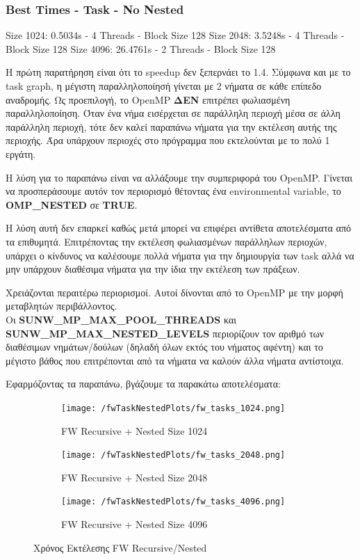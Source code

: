 \documentclass[letterpaper,12pt]{article}
\begin{document}
\subsubsection*{Best Times - Task - No Nested}
Size 1024: 0.5034s - 4 Threads - Block Size 128
\newline
Size 2048: 3.5248s - 4 Threads - Block Size 128
\newline
Size 4096: 26.4761s - 2 Threads - Block Size 128
\newline

Η πρώτη παρατήρηση είναι ότι το speedup δεν ξεπερνάει το 1.4. Σύμφωνα και με το task graph, η μέγιστη
παραλληλοποίησή γίνεται με 2 νήματα σε κάθε επίπεδο αναδρομής. Ως προεπιλογή, το OpenMP \textbf{ΔΕΝ}
επιτρέπει φωλιασμένη παραλληλοποίηση. Όταν ένα νήμα εισέρχεται σε παράλληλη περιοχή μέσα σε άλλη παράλληλη περιοχή,
τότε δεν καλεί παραπάνω νήματα για την εκτέλεση αυτής της περιοχής. Άρα υπάρχουν περιοχές στο πρόγραμμα που εκτελούνται
με το πολύ 1 εργάτη.

Η λύση για το παραπάνω είναι να αλλάξουμε την συμπεριφορά του OpenMP. Γίνεται να προσπεράσουμε αυτόν τον περιορισμό
θέτοντας ένα environmental variable, το \textbf{OMP\_NESTED}
σε \textbf{TRUE}.

Η λύση αυτή δεν επαρκεί καθώς μετά μπορεί να επιφέρει αντίθετα αποτελέσματα από τα επιθυμητά.
Επιτρέποντας την εκτέλεση φωλιασμένων παράλληλων περιοχών, υπάρχει ο κίνδυνος να καλέσουμε πολλά νήματα για την
δημιουργία των task αλλά να μην υπάρχουν διαθέσιμα νήματα για την ίδια την εκτέλεση των πράξεων.

Χρειάζονται περαιτέρω περιορισμοί. Αυτοί δίνονται από το OpenMP με την μορφή μεταβλητών
περιβάλλοντος.
\\
Οι \textbf{SUNW\_MP\_MAX\_POOL\_THREADS} και 
\textbf{SUNW\_MP\_MAX\_NESTED\_LEVELS} περιορίζουν τον αριθμό των διαθέσιμων
νημάτων/δούλων (δηλαδή όλων εκτός του νήματος αφέντη) και το μέγιστο βάθος που επιτρέπονται από τα νήματα να καλούν
άλλα νήματα αντίστοιχα.

Εφαρμόζοντας τα παραπάνω, βγάζουμε τα παρακάτω αποτελέσματα:

\begin{figure}[H]
    \centering
    \begin{subfigure}[b]{0.45\linewidth}
        \texttt{[image: /fwTaskNestedPlots/fw\_tasks\_1024.png]}
        \caption{FW Recursive + Nested Size 1024}
    \end{subfigure}
    \begin{subfigure}[b]{0.45\linewidth}
        \texttt{[image: /fwTaskNestedPlots/fw\_tasks\_2048.png]}
        \caption{FW Recursive + Nested Size 2048}
    \end{subfigure}
    \begin{subfigure}[b]{0.5\linewidth}
        \texttt{[image: /fwTaskNestedPlots/fw\_tasks\_4096.png]}
        \caption{FW Recursive + Nested Size 4096}
    \end{subfigure}
    \caption{Χρόνος Εκτέλεσης FW Recursive/Nested}
    \label{fig:Χρόνος Εκτέλεσης FW Recursive/Nested}
\end{figure}
\end{document}
